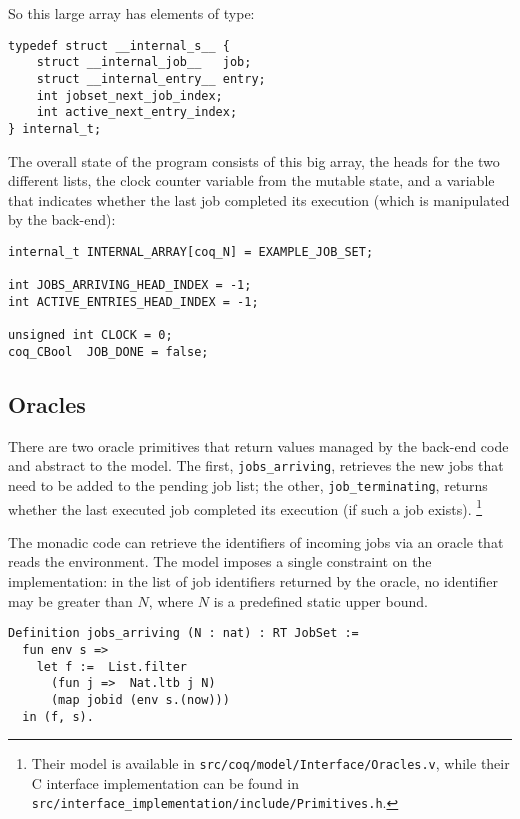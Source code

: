 	So this large array has elements of type:
	\begin{verbatim}
typedef struct __internal_s__ {
    struct __internal_job__   job;
    struct __internal_entry__ entry;
    int jobset_next_job_index;
    int active_next_entry_index;
} internal_t;
	\end{verbatim}

	The overall state of the program consists of this big array, the heads for the two different lists, the clock counter variable from the mutable state, and a variable that indicates whether the last job completed its execution (which is manipulated by the back-end):

	\begin{verbatim}
internal_t INTERNAL_ARRAY[coq_N] = EXAMPLE_JOB_SET;

int JOBS_ARRIVING_HEAD_INDEX = -1;
int ACTIVE_ENTRIES_HEAD_INDEX = -1;

unsigned int CLOCK = 0;
coq_CBool  JOB_DONE = false;
	\end{verbatim}

	\subsection{Oracles}

	There are two oracle primitives that return values managed by the back-end code and abstract to the model. The first, \texttt{jobs\_arriving}, retrieves the new jobs that need to be added to the pending job list; the other, \texttt{job\_terminating}, returns whether the last executed job completed its execution (if such a job exists). \footnote{Their model is available in \texttt{src/coq/model/Interface/Oracles.v}, while their C interface implementation can be found in \texttt{src/interface\_implementation/include/Primitives.h}.}

	The monadic code can retrieve the identifiers of incoming jobs via an oracle that reads the environment. The model imposes a single constraint on the implementation: in the list of job identifiers returned by the oracle, no identifier may be greater than $N$, where $N$ is a predefined static upper bound. 

	\begin{verbatim}
Definition jobs_arriving (N : nat) : RT JobSet :=
  fun env s =>
    let f :=  List.filter
      (fun j =>  Nat.ltb j N)
      (map jobid (env s.(now))) 
  in (f, s).
	\end{verbatim}

